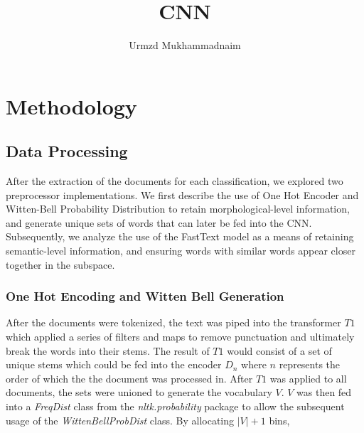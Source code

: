 \documentclass[12pt]{report}
\title{CNN}
\author{Urmzd Mukhammadnaim}
\begin{document}
\maketitle
\tableofcontents
\chapter{Methodology}
\section{Data Processing}

After the extraction of the documents for each classification, we explored two preprocessor implementations. 
We first describe the use of One Hot Encoder and Witten-Bell Probability Distribution to retain morphological-level information,
and generate unique sets of words that can later be fed into the CNN.
Subsequently, we analyze the use of the FastText model as a means of retaining semantic-level information,
and ensuring words with similar words appear closer together in the subspace.

\subsection{One Hot Encoding and Witten Bell Generation}
After the documents were tokenized, the text was piped into the transformer $T1$ which 
applied a series of filters and maps to remove punctuation and ultimately break the words into their stems.
The result of $T1$ would consist of a set of unique stems which could be fed into the encoder $D_n$ where 
$n$ represents the order of which the the document was processed in.
After $T1$ was applied to all documents, the sets were unioned to generate the vocabulary $V$.
$V$ was then fed into a \emph{FreqDist} class from the \emph{nltk.probability} package to allow the subsequent
usage of the \emph{WittenBellProbDist} class. By allocating $|V| + 1$ bins, 


\end{document}
